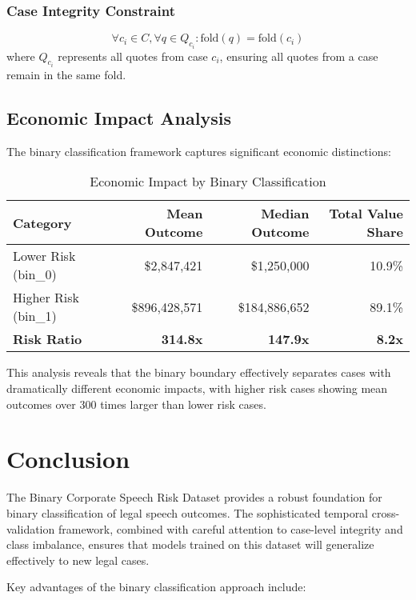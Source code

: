 \documentclass[11pt,a4paper]{article}
\begin{document}
\subsubsection{Case Integrity Constraint}
\begin{equation}
\forall c_i \in C, \forall q \in Q_{c_i}: \text{fold}(q) = \text{fold}(c_i)
\end{equation}
where $Q_{c_i}$ represents all quotes from case $c_i$, ensuring all quotes from a case remain in the same fold.

\subsection{Economic Impact Analysis}

The binary classification framework captures significant economic distinctions:

\begin{table}[H]
\centering
\caption{Economic Impact by Binary Classification}
\begin{tabular}{lrrr}
\toprule
\textbf{Category} & \textbf{Mean Outcome} & \textbf{Median Outcome} & \textbf{Total Value Share} \\
\midrule
Lower Risk (bin\_0) & \$2,847,421 & \$1,250,000 & 10.9\% \\
Higher Risk (bin\_1) & \$896,428,571 & \$184,886,652 & 89.1\% \\
\midrule
\textbf{Risk Ratio} & \textbf{314.8x} & \textbf{147.9x} & \textbf{8.2x} \\
\bottomrule
\end{tabular}
\end{table}

This analysis reveals that the binary boundary effectively separates cases with dramatically different economic impacts, with higher risk cases showing mean outcomes over 300 times larger than lower risk cases.

\section{Conclusion}

The Binary Corporate Speech Risk Dataset provides a robust foundation for binary classification of legal speech outcomes. The sophisticated temporal cross-validation framework, combined with careful attention to case-level integrity and class imbalance, ensures that models trained on this dataset will generalize effectively to new legal cases.

Key advantages of the binary classification approach include:
\end{document}
